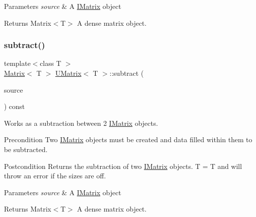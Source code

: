 \begin{DoxyParams}{Parameters}
{\em source} & A \mbox{\hyperlink{class_i_matrix}{I\+Matrix}} object \\
\hline
\end{DoxyParams}
\begin{DoxyReturn}{Returns}
Matrix$<$\+T$>$ A dense matrix object. 
\end{DoxyReturn}
\mbox{\label{class_u_matrix_a0de257500dfff1846e46b226af2292d2}} 
\subsubsection{\texorpdfstring{subtract()}{subtract()}\hspace{0.1cm}{\footnotesize\ttfamily [2/6]}}
{\footnotesize\ttfamily template$<$class T $>$ \\
\mbox{\hyperlink{class_matrix}{Matrix}}$<$ T $>$ \mbox{\hyperlink{class_u_matrix}{U\+Matrix}}$<$ T $>$\+::subtract (\begin{DoxyParamCaption}\item[{const \mbox{\hyperlink{class_i_matrix}{I\+Matrix}}$<$ \mbox{\hyperlink{class_t_matrix}{T\+Matrix}}$<$ T $>$, T $>$ \&}]{source }\end{DoxyParamCaption}) const}



Works as a subtraction between 2 \mbox{\hyperlink{class_i_matrix}{I\+Matrix}} objects. 

\begin{DoxyPrecond}{Precondition}
Two \mbox{\hyperlink{class_i_matrix}{I\+Matrix}} objects must be created and data filled within them to be subtracted. 
\end{DoxyPrecond}
\begin{DoxyPostcond}{Postcondition}
Returns the subtraction of two \mbox{\hyperlink{class_i_matrix}{I\+Matrix}} objects. T = T and will throw an error if the sizes are off.
\end{DoxyPostcond}

\begin{DoxyParams}{Parameters}
{\em source} & A \mbox{\hyperlink{class_i_matrix}{I\+Matrix}} object \\
\hline
\end{DoxyParams}
\begin{DoxyReturn}{Returns}
Matrix$<$\+T$>$ A dense matrix object. 
\end{DoxyReturn}
\mbox{\label{class_u_matrix_a91d154dcb9e91cd53dbf3c6ebbc40d20}} 

